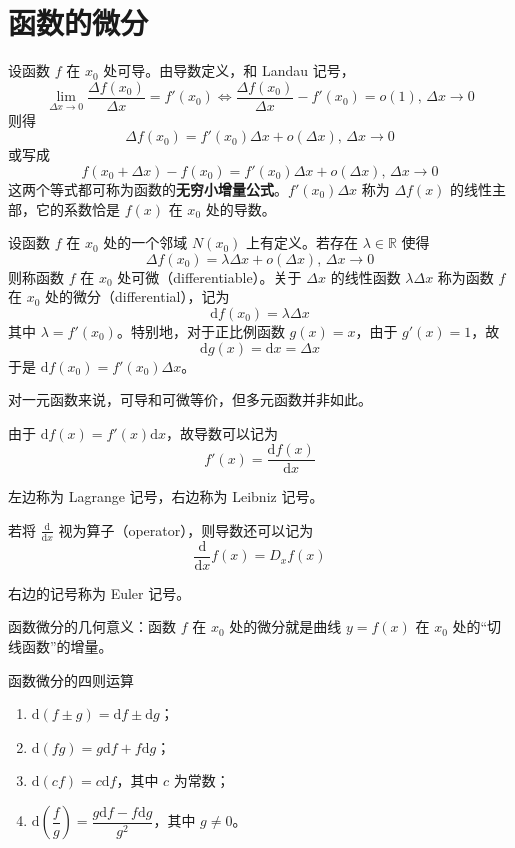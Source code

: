 
\section{函数的微分}

设函数 $f$ 在 $x_0$ 处可导。由导数定义，和 Landau 记号，
\[\lim_{\Delta x\to 0}\frac{\Delta f(x_0)}{\Delta x} = f'(x_0) \iff \frac{\Delta f(x_0)}{\Delta x} - f'(x_0) = o(1),\, \Delta x\to 0\]
则得
\begin{equation}
  \Delta f(x_0) = f'(x_0)\Delta x + o(\Delta x),\, \Delta x\to 0
\end{equation}
或写成
\begin{equation}
  f(x_0 + \Delta x) - f(x_0) = f'(x_0)\Delta x + o(\Delta x),\, \Delta x\to 0
\end{equation}
这两个等式都可称为函数的\textbf{无穷小增量公式}。$f'(x_0)\Delta x$ 称为 $\Delta f(x)$ 的线性主部，它的系数恰是 $f(x)$ 在 $x_0$ 处的导数。

\begin{definition}
  设函数 $f$ 在 $x_0$ 处的一个邻域 $N(x_0)$ 上有定义。若存在 $\lambda\in \mathbb{R}$ 使得
  \[\Delta f(x_0) = \lambda\Delta x + o(\Delta x),\, \Delta x\to 0\]
  则称函数 $f$ 在 $x_0$ 处可微（differentiable）。关于 $\Delta x$ 的线性函数 $\lambda\Delta x$ 称为函数 $f$ 在 $x_0$ 处的微分（differential），记为
  \[\mathrm{d}f(x_0) = \lambda\Delta x\]
  其中 $\lambda = f'(x_0)$。特别地，对于正比例函数 $g(x) = x$，由于 $g'(x) = 1$，故
  \[\mathrm{d}g(x) = \mathrm{d}x = \Delta x\]
  于是 $\mathrm{d}f(x_0) = f'(x_0)\Delta x$。
\end{definition}

对一元函数来说，可导和可微等价，但多元函数并非如此。

由于 $\mathrm{d}f(x) = f'(x)\mathrm{d}x$，故导数可以记为
\begin{equation}
  f'(x) = \frac{\mathrm{d}f(x)}{\mathrm{d}x}
\end{equation}

左边称为 Lagrange 记号，右边称为 Leibniz 记号。

若将 $\displaystyle \frac{\mathrm{d}}{\mathrm{d}x}$ 视为算子（operator），则导数还可以记为
\[\frac{\mathrm{d}}{\mathrm{d}x}f(x) = D_{x}f(x)\]

右边的记号称为 Euler 记号。

函数微分的几何意义：函数 $f$ 在 $x_0$ 处的微分就是曲线 $y = f(x)$ 在 $x_0$ 处的“切线函数”的增量。

\begin{theorem}
  函数微分的四则运算
  \begin{enumerate}
    \item $\mathrm{d}(f \pm g) = \mathrm{d}f \pm \mathrm{d}g$；
    \item $\mathrm{d}(fg) = g\mathrm{d}f + f\mathrm{d}g$；
    \item $\mathrm{d}(cf) = c\mathrm{d}f$，其中 $c$ 为常数；
    \item $\mathrm{d}\left(\dfrac{f}{g}\right) = \dfrac{g\mathrm{d}f - f\mathrm{d}g}{g^2}$，其中 $g \ne 0$。
  \end{enumerate}
\end{theorem}

